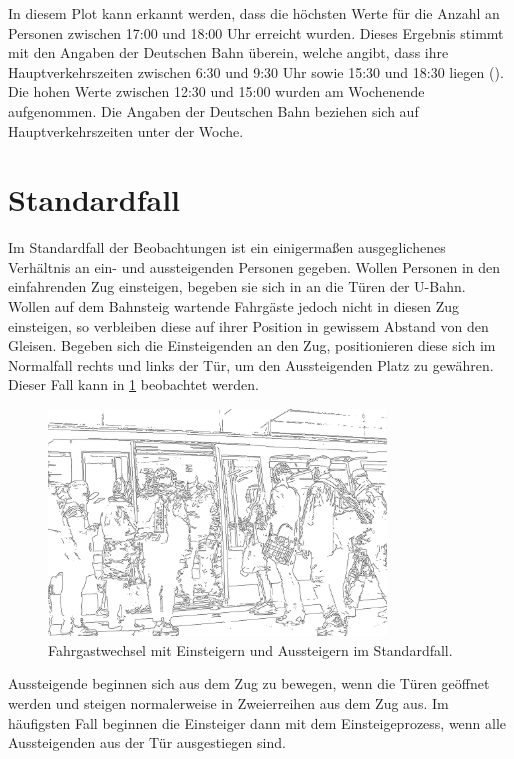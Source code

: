 In diesem Plot kann erkannt werden, dass die höchsten Werte für die Anzahl an Personen zwischen 17:00 und 18:00 Uhr erreicht wurden. Dieses Ergebnis stimmt mit den Angaben der Deutschen Bahn überein, welche angibt, dass ihre Hauptverkehrszeiten zwischen 6:30 und 9:30 Uhr sowie 15:30 und 18:30 liegen (\cite{DeutscheBahnAG.2018}). Die hohen Werte zwischen 12:30 und 15:00 wurden am Wochenende aufgenommen. Die Angaben der Deutschen Bahn beziehen sich auf Hauptverkehrszeiten unter der Woche.
\section{Standardfall}
Im Standardfall der Beobachtungen ist ein einigermaßen ausgeglichenes Verhältnis an ein- und aussteigenden Personen gegeben. Wollen Personen in den einfahrenden Zug einsteigen, begeben sie sich in an die Türen der U-Bahn. Wollen auf dem Bahnsteig wartende Fahrgäste jedoch nicht in diesen Zug einsteigen, so verbleiben diese auf ihrer Position in gewissem Abstand von den Gleisen. Begeben sich die Einsteigenden an den Zug, positionieren diese sich im Normalfall rechts und links der Tür, um den Aussteigenden Platz zu gewähren. Dieser Fall kann in \figurename \ref{fig:normalerFahrgastwechsel} beobachtet werden.
\begin{figure}[H] 
	\centering
		\includegraphics[width=0.8\textwidth]{pictures/observation/standard/exchange.png} 
	\caption{Fahrgastwechsel mit Einsteigern und Aussteigern im Standardfall.}
	\label{fig:normalerFahrgastwechsel}
\end{figure} 
Aussteigende beginnen sich aus dem Zug zu bewegen, wenn die Türen geöffnet werden und steigen normalerweise in Zweierreihen aus dem Zug aus. Im häufigsten Fall beginnen die Einsteiger dann mit dem Einsteigeprozess, wenn alle Aussteigenden aus der Tür ausgestiegen sind.
